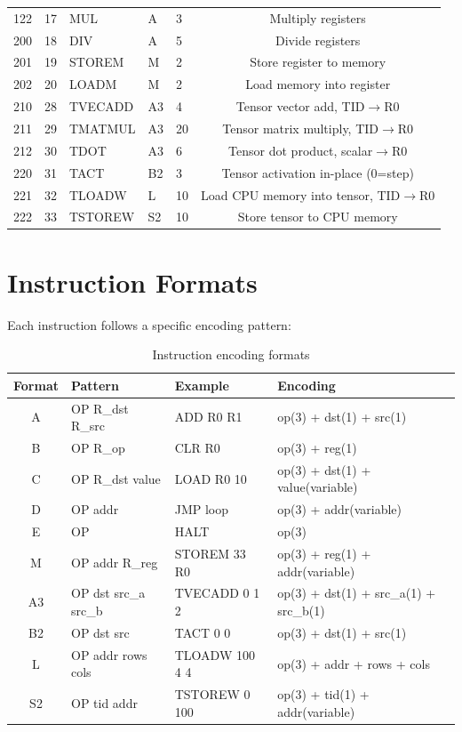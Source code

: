\documentclass[10pt,a4paper,twoside]{book}
\begin{document}
\begin{longtable}{cllllc}
122 & 17 & MUL     & A  & 3 & Multiply registers \\
200 & 18 & DIV     & A  & 5 & Divide registers \\
201 & 19 & STOREM  & M  & 2 & Store register to memory \\
202 & 20 & LOADM   & M  & 2 & Load memory into register \\
210 & 28 & TVECADD & A3 & 4 & Tensor vector add, TID$\rightarrow$R0 \\
211 & 29 & TMATMUL & A3 & 20 & Tensor matrix multiply, TID$\rightarrow$R0 \\
212 & 30 & TDOT    & A3 & 6 & Tensor dot product, scalar$\rightarrow$R0 \\
220 & 31 & TACT    & B2 & 3 & Tensor activation in-place (0=step) \\
221 & 32 & TLOADW  & L  & 10 & Load CPU memory into tensor, TID$\rightarrow$R0 \\
222 & 33 & TSTOREW & S2 & 10 & Store tensor to CPU memory \\
\end{longtable}

\section{Instruction Formats}

Each instruction follows a specific encoding pattern:

\begin{table}[H]
\centering
\caption{Instruction encoding formats}
\label{tab:formats}
\begin{tabular}{clll}
\toprule
Format & Pattern & Example & Encoding \\
\midrule
A & OP R\_dst R\_src & ADD R0 R1 & op(3) + dst(1) + src(1) \\
B & OP R\_op & CLR R0 & op(3) + reg(1) \\
C & OP R\_dst value & LOAD R0 10 & op(3) + dst(1) + value(variable) \\
D & OP addr & JMP loop & op(3) + addr(variable) \\
E & OP & HALT & op(3) \\
M & OP addr R\_reg & STOREM 33 R0 & op(3) + reg(1) + addr(variable) \\
A3 & OP dst src\_a src\_b & TVECADD 0 1 2 & op(3) + dst(1) + src\_a(1) + src\_b(1) \\
B2 & OP dst src & TACT 0 0 & op(3) + dst(1) + src(1) \\
L & OP addr rows cols & TLOADW 100 4 4 & op(3) + addr + rows + cols \\
S2 & OP tid addr & TSTOREW 0 100 & op(3) + tid(1) + addr(variable) \\
\bottomrule
\end{tabular}
\end{table}
\end{document}
